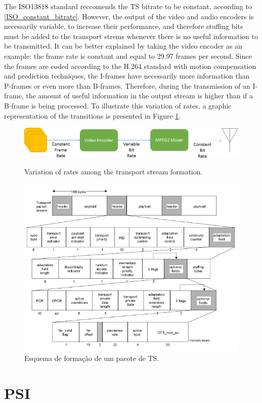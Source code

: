 \documentclass[
	12pt,				%
	openright,			%
	twoside,			%
	a4paper,			%
	brazil,
	french,				%
	english
	]{abntex2}
\begin{document}
The ISO13818 standard reccomends the TS bitrate to be constant, according to \ref{ISO_constant_bitrate}. However, the output of the video and audio encoders is necessarily variable, to increase their performance, and therefore stuffing bits must be added to the transport strems whenever there is no useful information to be transmitted. It can be better explained by taking the video encoder as an example: the frame rate is constant and equal to 29.97 frames per second. Since the frames are coded according to the H.264 standard with motion compensation and prediction techniques, the I-frames have necessarily more information than P-frames or even more than B-frames. Therefore, during the transmission of an I-frame, the amount of useful information in the output stream is higher than if a B-frame is being processed. To illustrate this variation of rates, a graphic representation of the transitions is presented in Figure \ref{fig:rate_transitions}.

\begin{figure}
\centering
\caption{Variation of rates among the transport stream formation.}
\includegraphics[width=1\linewidth]{figuras/rate_transitions.png}
\label{fig:rate_transitions}
\end{figure}

\begin{figure}
\centering
\includegraphics[width=0.6\linewidth]{figuras/TS_iso13818.png}
\caption{Esquema de formação de um pacote de TS.}
\label{fig:TS_iso13818}
\end{figure}


\section{PSI}
\end{document}

